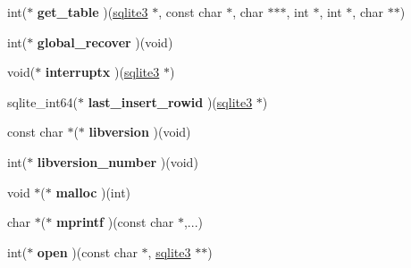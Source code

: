 \begin{DoxyCompactItemize}
\item 
int($\ast$ {\bfseries get\+\_\+table} )(\hyperlink{structsqlite3}{sqlite3} $\ast$, const char $\ast$, char $\ast$$\ast$$\ast$, int $\ast$, int $\ast$, char $\ast$$\ast$)\hypertarget{structsqlite3__api__routines_a49be6136a17441b04e3feec330d9dd52}{}\label{structsqlite3__api__routines_a49be6136a17441b04e3feec330d9dd52}

\item 
int($\ast$ {\bfseries global\+\_\+recover} )(void)\hypertarget{structsqlite3__api__routines_a9b90b5ea9b2fae5a60b9ddc86c72e1a8}{}\label{structsqlite3__api__routines_a9b90b5ea9b2fae5a60b9ddc86c72e1a8}

\item 
void($\ast$ {\bfseries interruptx} )(\hyperlink{structsqlite3}{sqlite3} $\ast$)\hypertarget{structsqlite3__api__routines_a3cfec591003c4e8b1f1bdb82a80b8e19}{}\label{structsqlite3__api__routines_a3cfec591003c4e8b1f1bdb82a80b8e19}

\item 
sqlite\+\_\+int64($\ast$ {\bfseries last\+\_\+insert\+\_\+rowid} )(\hyperlink{structsqlite3}{sqlite3} $\ast$)\hypertarget{structsqlite3__api__routines_aeeda8d84c8060c99e24d97ae60bf6046}{}\label{structsqlite3__api__routines_aeeda8d84c8060c99e24d97ae60bf6046}

\item 
const char $\ast$($\ast$ {\bfseries libversion} )(void)\hypertarget{structsqlite3__api__routines_a126a447b5724f50142603d94d9470336}{}\label{structsqlite3__api__routines_a126a447b5724f50142603d94d9470336}

\item 
int($\ast$ {\bfseries libversion\+\_\+number} )(void)\hypertarget{structsqlite3__api__routines_a70d0b04a52493c15f26815990a50afa7}{}\label{structsqlite3__api__routines_a70d0b04a52493c15f26815990a50afa7}

\item 
void $\ast$($\ast$ {\bfseries malloc} )(int)\hypertarget{structsqlite3__api__routines_a37193f93e0626dae6e302d0bd47de4cf}{}\label{structsqlite3__api__routines_a37193f93e0626dae6e302d0bd47de4cf}

\item 
char $\ast$($\ast$ {\bfseries mprintf} )(const char $\ast$,...)\hypertarget{structsqlite3__api__routines_a82cc01d97e2552bad02554ed50e4d2b8}{}\label{structsqlite3__api__routines_a82cc01d97e2552bad02554ed50e4d2b8}

\item 
int($\ast$ {\bfseries open} )(const char $\ast$, \hyperlink{structsqlite3}{sqlite3} $\ast$$\ast$)\hypertarget{structsqlite3__api__routines_a1d0126d7384e1e4e0975d3084007af89}{}\label{structsqlite3__api__routines_a1d0126d7384e1e4e0975d3084007af89}


\end{DoxyCompactItemize}
